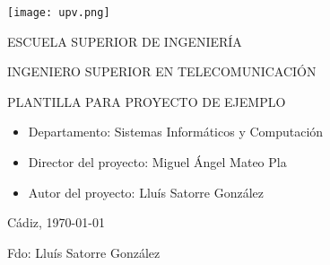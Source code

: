 

\begin{center}

  \texttt{[image: upv.png]} \\

  \vspace{2.0cm}

  \Large{ESCUELA SUPERIOR DE INGENIERÍA} \\

  \vspace{1.0cm}

  \large{INGENIERO SUPERIOR EN TELECOMUNICACIÓN} \\

  \vspace{2.0cm}

  \large{PLANTILLA PARA PROYECTO DE EJEMPLO} \\

  \vspace{1.0cm}

\end{center}

\begin{itemize}
\item \large{Departamento: Sistemas Informáticos y Computación}
\item \large{Director del proyecto: Miguel Ángel Mateo Pla}
\item \large{Autor del proyecto: Lluís Satorre González}
\end{itemize}

\vspace{1.0cm}

\begin{flushright}
  \large{Cádiz, \today} \\

  \vspace{2.5cm}

  \large{Fdo: Lluís Satorre González}
\end{flushright}
